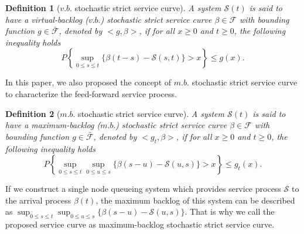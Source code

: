 \documentclass[paper]{ieice}
\newtheorem{definition}{Definition}
\begin{document}
\begin{definition}[$v.b.$ stochastic strict service curve]
A system $\mathcal{S}(t)$ is said to have a virtual-backlog ($v.b.$) stochastic strict service curve $\beta\in\mathcal{F}$ with bounding function $g\in\bar{\mathcal{F}}$, denoted by $<g,\beta>$, if for all $x\geq 0$ and $t\geq 0$, the following inequality holds
$$P\left\{\sup_{0\leq s\leq t}\{\beta(t-s)-\mathcal{S}(s,t)\}>x\right\}\leq g(x).$$
\end{definition}

In this paper, we also proposed the concept of $m.b.$ stochastic strict service curve to characterize the feed-forward service process.
\begin{definition}[$m.b.$ stochastic strict service curve]
A system $\mathcal{S}(t)$ is said to have a maximum-backlog ($m.b.$) stochastic strict service curve $\beta\in\mathcal{F}$ with bounding function $g\in\bar{\mathcal{F}}$, denoted by $<g_t,\beta>$, if for all $x\geq 0$ and $t\geq 0$, the following inequality holds
$$P\left\{\sup_{0\leq s\leq t}\sup_{0\leq u\leq s}\{\beta(s-u)-\mathcal{S}(u,s)\}>x\right\}\leq g_t(x).$$
\end{definition}

If we construct a single node queueing system which provides service process $\mathcal{S}$ to the arrival process $\beta(t)$, the maximum backlog of this system can be described as $\sup_{0\leq s\leq t}\sup_{0\leq u\leq s}\{\beta(s-u)-\mathcal{S}(u,s)\}$. That is why we call the proposed service curve as maximum-backlog stochastic strict service curve.
\end{document}
